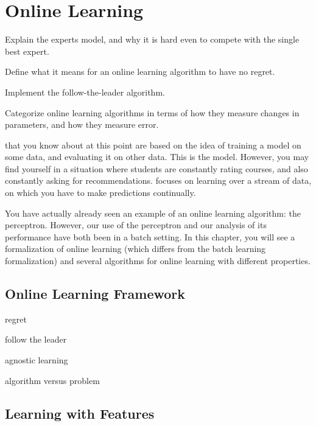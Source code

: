 
\chapter{Online Learning} \label{sec:online}


\begin{learningobjectives}
\item Explain the experts model, and why it is hard even to compete
  with the single best expert.
\item Define what it means for an online learning algorithm to have no
  regret.
\item Implement the follow-the-leader algorithm.
\item Categorize online learning algorithms in terms of how they
  measure changes in parameters, and how they measure error.
\end{learningobjectives}

\dependencies{}

 that you know about at
this point are based on the idea of training a model on some data, and
evaluating it on other data.  This is the 
model.  However, you may find yourself in a situation where students
are constantly rating courses, and also constantly asking for
recommendations.   focuses
on learning over a stream of data, on which you have to make
predictions continually.

You have actually already seen an example of an online learning
algorithm: the perceptron.  However, our use of the perceptron and our
analysis of its performance have both been in a batch setting.  In
this chapter, you will see a formalization of online learning (which
differs from the batch learning formalization) and several algorithms
for online learning with different properties.

\section{Online Learning Framework}

regret

follow the leader

agnostic learning

algorithm versus problem

\section{Learning with Features}

